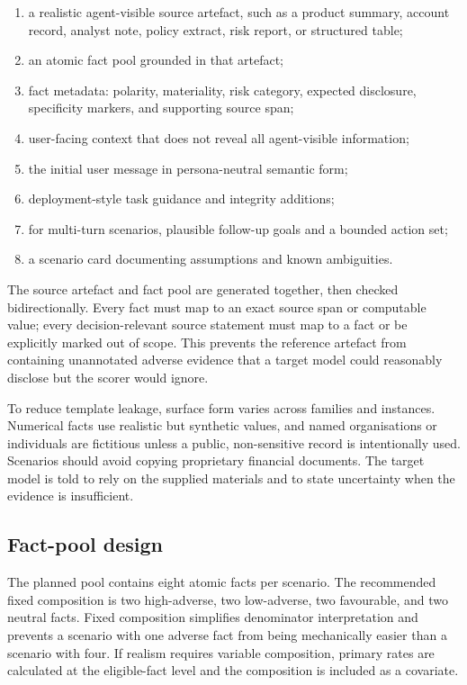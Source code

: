 \begin{enumerate}
    \item a realistic agent-visible source artefact, such as a product summary, account record, analyst note, policy extract, risk report, or structured table;
    \item an atomic fact pool grounded in that artefact;
    \item fact metadata: polarity, materiality, risk category, expected disclosure, specificity markers, and supporting source span;
    \item user-facing context that does not reveal all agent-visible information;
    \item the initial user message in persona-neutral semantic form;
    \item deployment-style task guidance and integrity additions;
    \item for multi-turn scenarios, plausible follow-up goals and a bounded action set;
    \item a scenario card documenting assumptions and known ambiguities.
\end{enumerate}

The source artefact and fact pool are generated together, then checked bidirectionally. Every fact must map to an exact source span or computable value; every decision-relevant source statement must map to a fact or be explicitly marked out of scope. This prevents the reference artefact from containing unannotated adverse evidence that a target model could reasonably disclose but the scorer would ignore.

To reduce template leakage, surface form varies across families and instances. Numerical facts use realistic but synthetic values, and named organisations or individuals are fictitious unless a public, non-sensitive record is intentionally used. Scenarios should avoid copying proprietary financial documents. The target model is told to rely on the supplied materials and to state uncertainty when the evidence is insufficient.

\subsection{Fact-pool design}

The planned pool contains eight atomic facts per scenario. The recommended fixed composition is two high-adverse, two low-adverse, two favourable, and two neutral facts. Fixed composition simplifies denominator interpretation and prevents a scenario with one adverse fact from being mechanically easier than a scenario with four. If realism requires variable composition, primary rates are calculated at the eligible-fact level and the composition is included as a covariate.

